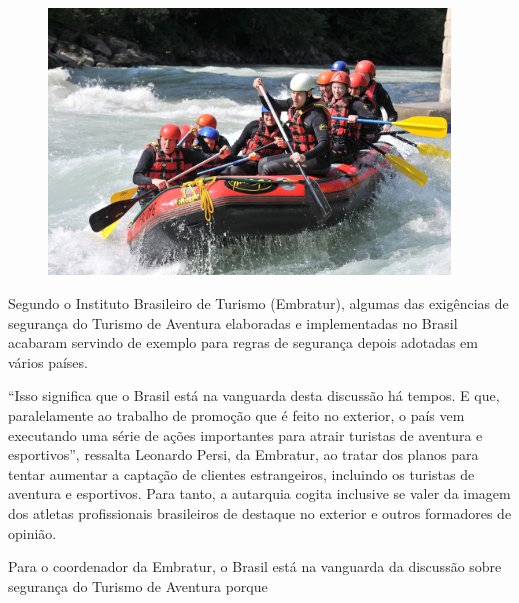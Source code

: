 \begin{myquote}

\begin{figure}[H]
\centering
\includegraphics[width=0.95\textwidth]{./imgSAEB_7_POR/media/image40.png}
\end{figure}

Segundo o Instituto Brasileiro de Turismo (Embratur), algumas das exigências de
segurança do Turismo de Aventura elaboradas e implementadas no Brasil acabaram 
servindo de exemplo para regras de segurança depois adotadas em vários países.

``Isso significa que o Brasil está na vanguarda desta discussão há tempos. E
que, paralelamente ao trabalho de promoção que é feito no exterior, o país vem
executando uma série de ações importantes para atrair turistas de aventura e
esportivos'', ressalta Leonardo Persi, da Embratur, ao tratar dos planos para tentar
aumentar a captação de clientes estrangeiros, incluindo os turistas de
aventura e esportivos. Para tanto, a autarquia cogita inclusive se valer da
imagem dos atletas profissionais brasileiros de destaque no exterior e outros
formadores de opinião.

\end{myquote}

Para o coordenador da Embratur, o Brasil está na vanguarda da discussão sobre 
segurança do Turismo de Aventura porque 

